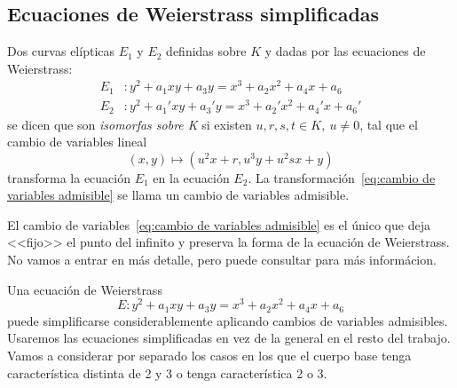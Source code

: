 \subsection{Ecuaciones de Weierstrass simplificadas}
\label{sub:Ecuaciones de Weierstrass simplificadas}

\begin{definicion}
	Dos curvas elípticas $E_1$ y $E_2$ definidas sobre $K$ y dadas por las ecuaciones de Weierstrass:
	\begin{align*}
		E_1 &: y^2 + a_1 x y + a_3 y = x^3 + a_2 x^2 + a_4 x + a_6 \\
		E_2 &: y^2 + a_1' x y + a_3' y = x^3 + a_2' x^2 + a_4' x + a_6'
	\end{align*}
	se dicen que son \emph{isomorfas sobre K} si existen $u, r, s, t \in K,\ u \neq 0$, tal que el cambio de variables lineal
	\begin{equation}\label{eq:cambio de variables admisible}
	(x, y) \mapsto (u^2 x + r, u^3 y + u^2 s x + y)
	\end{equation}
	transforma la ecuación $E_1$ en la ecuación $E_2$. La transformación~\eqref{eq:cambio de variables admisible} se llama un cambio de variables admisible.

	El cambio de variables~\eqref{eq:cambio de variables admisible} es el único que deja <<fijo>> el punto del infinito y preserva la forma de la ecuación de Weierstrass. No vamos a entrar en más detalle, pero puede consultar \cite[prop. III.3.1b]{Silverman:2009} para más informácion.
\end{definicion}


Una ecuación de Weierstrass
$$
E:  y^2 + a_1 x y + a_3 y = x^3 + a_2 x^2 + a_4 x + a_6
$$
puede simplificarse considerablemente aplicando cambios de variables admisibles. Usaremos las ecuaciones simplificadas en vez de la general en el resto del trabajo. Vamos a considerar por separado los casos en los que el cuerpo base tenga característica distinta de 2 y 3 o tenga característica 2 o 3.

